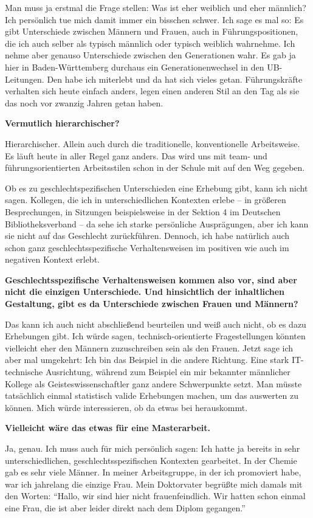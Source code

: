 \documentclass[a4paper,
fontsize=11pt,
oneside,
numbers=noperiodatend,
parskip=half-,
bibliography=totoc,
final
]{scrartcl}
\begin{document}
Man muss ja erstmal die Frage stellen: Was ist eher weiblich und eher
männlich? Ich persönlich tue mich damit immer ein bisschen schwer. Ich
sage es mal so: Es gibt Unterschiede zwischen Männern und Frauen, auch
in Führungspositionen, die ich auch selber als typisch männlich oder
typisch weiblich wahrnehme. Ich nehme aber genauso Unterschiede zwischen
den Generationen wahr. Es gab ja hier in Baden-Württemberg durchaus ein
Generationenwechsel in den UB-Leitungen. Den habe ich miterlebt und da
hat sich vieles getan. Führungskräfte verhalten sich heute einfach
anders, legen einen anderen Stil an den Tag als sie das noch vor zwanzig
Jahren getan haben.

\textbf{Vermutlich hierarchischer?}

Hierarchischer. Allein auch durch die traditionelle, konventionelle
Arbeitsweise. Es läuft heute in aller Regel ganz anders. Das wird uns
mit team- und führungsorientierten Arbeitsstilen schon in der Schule mit
auf den Weg gegeben.

Ob es zu geschlechtspezifischen Unterschieden eine Erhebung gibt, kann
ich nicht sagen. Kollegen, die ich in unterschiedlichen Kontexten erlebe
-- in größeren Besprechungen, in Sitzungen beispielsweise in der Sektion
4 im Deutschen Bibliotheksverband -- da sehe ich starke persönliche
Ausprägungen, aber ich kann sie nicht auf das Geschlecht zurückführen.
Dennoch, ich habe natürlich auch schon ganz geschlechtsspezifische
Verhaltensweisen im positiven wie auch im negativen Kontext erlebt.

\textbf{Geschlechtsspezifische Verhaltensweisen kommen also vor, sind
aber nicht die einzigen Unterschiede. Und hinsichtlich der inhaltlichen
Gestaltung, gibt es da Unterschiede zwischen Frauen und Männern?}

Das kann ich auch nicht abschließend beurteilen und weiß auch nicht, ob
es dazu Erhebungen gibt. Ich würde sagen, technisch-orientierte
Fragestellungen könnten vielleicht eher den Männern zuzuschreiben sein
als den Frauen. Jetzt sage ich aber mal umgekehrt: Ich bin das Beispiel
in die andere Richtung. Eine stark IT-technische Ausrichtung, während
zum Beispiel ein mir bekannter männlicher Kollege als
Geisteswissenschaftler ganz andere Schwerpunkte setzt. Man müsste
tatsächlich einmal statistisch valide Erhebungen machen, um das
auswerten zu können. Mich würde interessieren, ob da etwas bei
herauskommt.

\textbf{Vielleicht wäre das etwas für eine Masterarbeit.}

Ja, genau. Ich muss auch für mich persönlich sagen: Ich hatte ja bereits
in sehr unterschiedlichen, geschlechtsspezifischen Kontexten gearbeitet.
In der Chemie gab es sehr viele Männer. In meiner Arbeitsgruppe, in der
ich promoviert habe, war ich jahrelang die einzige Frau. Mein
Doktorvater begrüßte mich damals mit den Worten: \enquote{Hallo, wir
sind hier nicht frauenfeindlich. Wir hatten schon einmal eine Frau, die
ist aber leider direkt nach dem Diplom gegangen.}
\end{document}
